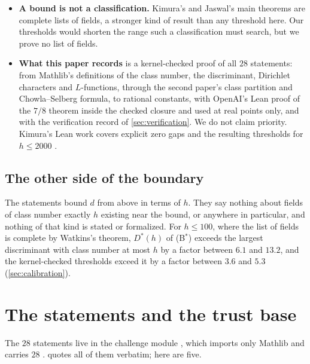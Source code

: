 \documentclass[11pt]{article}
\theoremstyle{definition}
\begin{document}
\begin{itemize}
\item \textbf{A bound is not a classification.} Kimura's and Jaswal's main theorems are complete lists of fields, a stronger kind of result than any threshold here. Our thresholds would shorten the range such a classification must search, but we prove no list of fields.
\item \textbf{What this paper records} is a kernel-checked proof of all $28$ statements: from Mathlib's definitions of the class number, the discriminant, Dirichlet characters and $L$-functions, through the second paper's class partition and Chowla--Selberg formula, to rational constants, with OpenAI's Lean proof of the $7/8$ theorem inside the checked closure and used at real points only, and with the verification record of \cref{sec:verification}. We do not claim priority. Kimura's Lean work covers explicit zero gaps and the resulting thresholds for $h \le 2000$ \cite{Kimura2026}.
\end{itemize}

\subsection{The other side of the boundary}\label{sec:otherside}

The statements bound $d$ from above in terms of $h$. They say nothing about fields of class number exactly $h$ existing near the bound, or anywhere in particular, and nothing of that kind is stated or formalized. For $h \le 100$, where the list of fields is complete by Watkins's theorem, $D^*(h)$ of (B$^*$) exceeds the largest discriminant with class number at most $h$ by a factor between $6.1$ and $13.2$, and the kernel-checked thresholds exceed it by a factor between $3.6$ and $5.3$ (\cref{sec:calibration}).

\section{The statements and the trust base}\label{sec:statement}

The $28$ statements live in the challenge module , which imports only Mathlib and carries $28$ .  quotes all of them verbatim; here are five.
\end{document}
